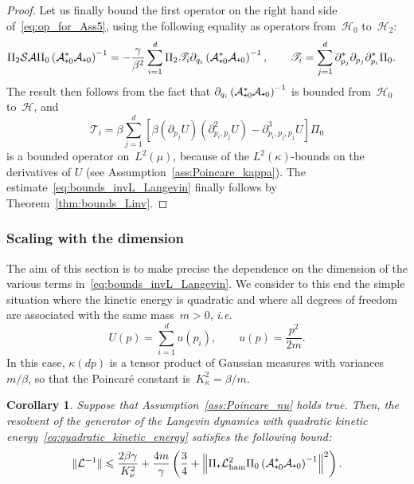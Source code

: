 \documentclass{article}
\newtheorem{corollary}{Corollary}
\newcommand{\cL}{\mathcal{L}}
\newcommand{\cLs}{\mathcal{S}}
\newcommand{\cLa}{\mathcal{A}}
\newcommand{\cLham}{\mathcal{L}_{\rm ham}}
\newcommand{\cH}{\mathcal{H}}
\newcommand{\subplus}{\textnormal{\texttt{+}}}
\renewcommand{\leq}{\leqslant}
\begin{document}
\begin{proof}
Let us finally bound the first operator on the right hand side of~\eqref{eq:op_for_Ass5}, using the following equality as operators from~$\cH_0$ to~$\cH_2$: 
\[
  \begin{aligned}
    \Pi_2 \cLs \cLa \Pi_0 \left(\cLa_{\subplus 0}^*\cLa_{\subplus 0}\right)^{-1} & = -\frac{\gamma}{\beta^2} \sum_{i=1}^d \Pi_2 \mathscr{T}_{i} \partial_{q_i} \left(\cLa_{\subplus 0}^*\cLa_{\subplus 0}\right)^{-1},
\qquad 
\mathscr{T}_i = \sum_{j=1}^d \partial_{p_j}^* \partial_{p_j} \partial_{p_i}^* \Pi_0.
\end{aligned}
\]
The result then follows from the fact that $\partial_{q_i} \left(\cLa_{\subplus 0}^*\cLa_{\subplus 0}\right)^{-1}$ is bounded from~$\cH_0$ to~$\cH$, and
\[
  \mathscr{T}_i = \beta \sum_{j=1}^d \left[\beta \left(\partial_{p_j}U\right)\left(\partial^2_{p_i, p_j}U\right) -\partial^3_{p_i, p_j, p_j} U\right] \Pi_0
\]
is a bounded operator on~$L^2(\mu)$, because of the $L^2(\kappa)$-bounds on the derivatives of $U$ (see Assumption~\ref{ass:Poincare_kappa}). The estimate~\eqref{eq:bounds_invL_Langevin} finally follows by Theorem~\ref{thm:bounds_Linv}.
\end{proof}

\subsubsection{Scaling with the dimension}
\label{sec:scaling_dimension_Langevin}

The aim of this section is to make precise the dependence on the dimension of the various terms in~\eqref{eq:bounds_invL_Langevin}. We consider to this end the simple situation where the kinetic energy is quadratic and where all degrees of freedom are associated with the same mass~$m>0$, \emph{i.e.} 
\begin{equation}
  \label{eq:quadratic_kinetic_energy}
  U(p) = \sum_{i=1}^d u(p_i), \qquad u(p) = \frac{p^2}{2m}.
\end{equation}
In this case, $\kappa(dp)$ is a tensor product of Gaussian measures with variances~$m/\beta$, so that the Poincar\'e constant is~$K_\kappa^2 = \beta/m$. 

\begin{corollary}
  \label{cor:Lang}
  Suppose that Assumption~\ref{ass:Poincare_nu} holds true. Then, the resolvent of the generator of the Langevin dynamics with quadratic kinetic energy~\eqref{eq:quadratic_kinetic_energy} satisfies the following bound:
  \begin{equation}
    \label{eq:bounds_invL_Langevin_quadratic}
    \|\cL^{-1}\| \leq \frac{2\beta\gamma}{K_\nu^2} + \frac{4 m}{\gamma} \left( \frac34 + \left\| \Pi_\subplus \cLham^2 \Pi_0 \left(\cLa_{\subplus 0}^*\cLa_{\subplus 0}\right)^{-1} \right\|^2 \right).
  \end{equation}
\end{corollary}
\end{document}
